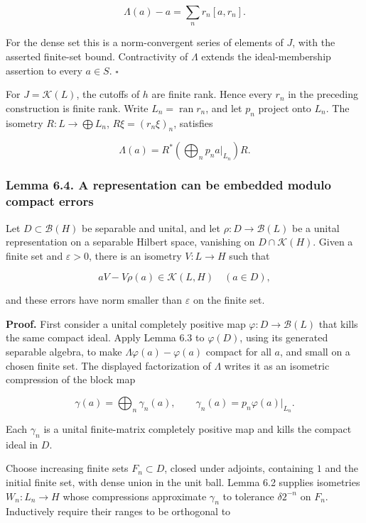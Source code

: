 \documentclass[
  11pt,
]{article}
\begin{document}
\[
\Lambda(a)-a=\sum_nr_n[a,r_n].
\]

For the dense set this is a norm-convergent series of elements of \(J\),
with the asserted finite-set bound. Contractivity of \(\Lambda\) extends
the ideal-membership assertion to every \(a\in S\). \(\square\)

For \(J=\mathcal K(L)\), the cutoffs of \(h\) are finite rank. Hence
every \(r_n\) in the preceding construction is finite rank. Write
\(L_n=\operatorname{ran}r_n\), and let \(p_n\) project onto \(L_n\). The
isometry \(R:L\to\bigoplus L_n\), \(R\xi=(r_n\xi)_n\), satisfies

\[
\Lambda(a)=R^*\left(\bigoplus_np_na|_{L_n}\right)R.
\]

\subsubsection{Lemma 6.4. A representation can be embedded modulo
compact
errors}\label{lemma-6.4.-a-representation-can-be-embedded-modulo-compact-errors}

Let \(D\subset\mathcal B(H)\) be separable and unital, and let
\(\rho:D\to\mathcal B(L)\) be a unital representation on a separable
Hilbert space, vanishing on \(D\cap\mathcal K(H)\). Given a finite set
and \(\varepsilon>0\), there is an isometry \(V:L\to H\) such that

\[
aV-V\rho(a)\in\mathcal K(L,H)\quad(a\in D),
\]

and these errors have norm smaller than \(\varepsilon\) on the finite
set.

\textbf{Proof.} First consider a unital completely positive map
\(\varphi:D\to\mathcal B(L)\) that kills the same compact ideal. Apply
Lemma 6.3 to \(\varphi(D)\), using its generated separable algebra, to
make \(\Lambda\varphi(a)-\varphi(a)\) compact for all \(a\), and small
on a chosen finite set. The displayed factorization of \(\Lambda\)
writes it as an isometric compression of the block map

\[
\gamma(a)=\bigoplus_n\gamma_n(a),\qquad
\gamma_n(a)=p_n\varphi(a)|_{L_n}.
\]

Each \(\gamma_n\) is a unital finite-matrix completely positive map and
kills the compact ideal in \(D\).

Choose increasing finite sets \(F_n\subset D\), closed under adjoints,
containing \(1\) and the initial finite set, with dense union in the
unit ball. Lemma 6.2 supplies isometries \(W_n:L_n\to H\) whose
compressions approximate \(\gamma_n\) to tolerance \(\delta2^{-n}\) on
\(F_n\). Inductively require their ranges to be orthogonal to
\end{document}
